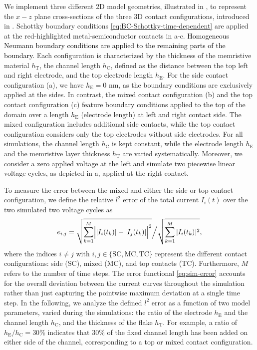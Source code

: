 \documentclass[10pt,a4paper, final]{article}
\newcommand{\reviewerTwo}[1]{\textcolor{black}{#1}}
\theoremstyle{definition}								%
\numberwithin{equation}{section}
\numberwithin{figure}{section}
\numberwithin{theorem}{section}
\begin{document}
We implement three different 2D model geometries, illustrated in , to represent the $x-z$ plane cross-sections of the three 3D contact configurations, introduced in .
Schottky boundary conditions \eqref{eq:BC-Schottky-time-dependent} are applied at the red-highlighted metal-semiconductor contacts in a-c.
\reviewerTwo{Homogeneous Neumann boundary conditions are applied to the remaining parts of the boundary.}
Each configuration is characterized by the thickness of the memristive material  $h_\mathrm{T}$, the channel length $h_\mathrm{C}$, defined as the distance between the top left and right electrode, and the top electrode length $h_\text{E}$.
For the side contact configuration (a), we have $h_\text{E} = 0$ nm, as the boundary conditions are exclusively applied at the sides.
In contrast, the mixed contact configuration (b) and the top contact configuration (c) feature boundary conditions applied to the top of the domain over a length $h_\mathrm{E}$ (electrode length) at left and right contact side.
The mixed configuration includes additional side contacts, while the top contact configuration considers only the top electrodes without side electrodes.
For all simulations, the channel length $h_\text{C}$ is kept constant, while the electrode length $h_\text{E}$ and the memristive layer thickness $h_\text{T}$ are varied systematically.
Moreover, we consider a zero applied voltage at the left and simulate two piecewise linear voltage cycles, as depicted in a, applied at the right contact.

To measure the error between the mixed and either the side or top contact configuration, we define the relative $l^2$ error of the total current $I_i(t)$ over the two simulated two voltage cycles as
\begin{align} \label{eq:sim-error}
    e_{i, j}= \sqrt{\sum_{k=1}^M \Bigl| |I_{i}(t_k)| - |I_{j}(t_k)| \Bigr|^2} \Big/ \sqrt{\sum_{k=1}^M |I_{i}(t_k)|^2},
\end{align}
where the indices $i \neq j$ with $i, j \in \{ {\text{SC}, \text{MC}, \text{TC}}\}$ represent the different contact configurations: side (SC), mixed (MC), and top contacts (TC).
Furthermore, $M$ refers to the number of time steps.
The error functional \eqref{eq:sim-error} accounts for the overall deviation between the current curves throughout the simulation rather than just capturing the pointwise maximum deviation at a single time step.
In the following, we analyze the defined $l^2$ error as a function of two model parameters, varied during the simulations: the ratio of the electrode $h_\text{E}$ and the channel length $h_\text{C}$, and the thickness of the flake $h_\text{T}$.
For example, a ratio of $h_\text{E}/h_\text{C}=30$\% indicates that 30\% of the fixed channel length has been added on either side of the channel, corresponding to a top or mixed contact configuration.
\end{document}
